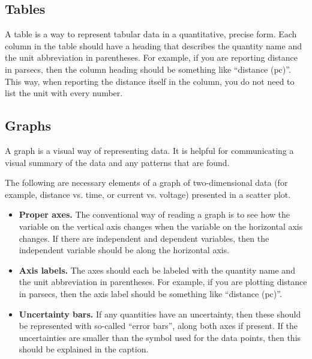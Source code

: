 \subsection{Tables}

A table is a way to represent tabular data in a quantitative, precise form. Each column in the table should have a heading that describes the quantity name and the unit abbreviation in parentheses. For example, if you are reporting distance in parsecs, then the column heading should be something like ``distance (pc)''. This way, when reporting the distance itself in the column, you do not need to list the unit with every number.

\subsection{Graphs}

A graph is a visual way of representing data. It is helpful for communicating a visual summary of the data and any patterns that are found.

The following are necessary elements of a graph of two-dimensional data (for example, distance vs. time, or current vs. voltage) presented in a scatter plot.

\begin{itemize}
	\item \textbf{Proper axes.} The conventional way of reading a graph is to see how the variable on the vertical axis changes when the variable on the horizontal axis changes. If there are independent and dependent variables, then the independent variable should be along the horizontal axis.
	
	\item \textbf{Axis labels.} The axes should each be labeled with the quantity name and the unit abbreviation in parentheses. For example, if you are plotting distance in parsecs, then the axis label should be something like ``distance (pc)''.
	
	\item \textbf{Uncertainty bars.} If any quantities have an uncertainty, then these should be represented with so-called ``error bars'', along both axes if present. If the uncertainties are smaller than the symbol used for the data points, then this should be explained in the caption.

\end{itemize}

